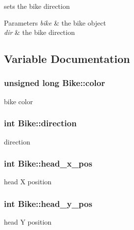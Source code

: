 sets the bike direction 


\begin{DoxyParams}{Parameters}
{\em bike} & the bike object\\
\hline
{\em dir} & the bike direction \\
\hline
\end{DoxyParams}


\subsection{Variable Documentation}
\subsubsection[{\texorpdfstring{color}{color}}]{\setlength{\rightskip}{0pt plus 5cm}unsigned long Bike\+::color}\hypertarget{group__Bike_ga7ba066e0787d8b239b8cb16775db0eac}{}\label{group__Bike_ga7ba066e0787d8b239b8cb16775db0eac}
bike color 
\subsubsection[{\texorpdfstring{direction}{direction}}]{\setlength{\rightskip}{0pt plus 5cm}int Bike\+::direction}\hypertarget{group__Bike_ga9a5251a8d520f2ce0fc0e34dd7325a23}{}\label{group__Bike_ga9a5251a8d520f2ce0fc0e34dd7325a23}
direction 
\subsubsection[{\texorpdfstring{head\+\_\+x\+\_\+pos}{head_x_pos}}]{\setlength{\rightskip}{0pt plus 5cm}int Bike\+::head\+\_\+x\+\_\+pos}\hypertarget{group__Bike_ga3187c35b871d499fb88aca98de35282a}{}\label{group__Bike_ga3187c35b871d499fb88aca98de35282a}
head X position 
\subsubsection[{\texorpdfstring{head\+\_\+y\+\_\+pos}{head_y_pos}}]{\setlength{\rightskip}{0pt plus 5cm}int Bike\+::head\+\_\+y\+\_\+pos}\hypertarget{group__Bike_ga48e90acd4f7eceb4ea0921f9a8b89f98}{}\label{group__Bike_ga48e90acd4f7eceb4ea0921f9a8b89f98}
head Y position 
